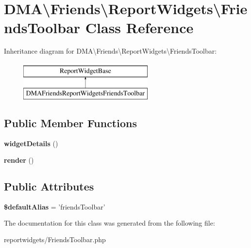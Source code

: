 \hypertarget{classDMA_1_1Friends_1_1ReportWidgets_1_1FriendsToolbar}{\section{D\-M\-A\textbackslash{}Friends\textbackslash{}Report\-Widgets\textbackslash{}Friends\-Toolbar Class Reference}
\label{classDMA_1_1Friends_1_1ReportWidgets_1_1FriendsToolbar}
}
Inheritance diagram for D\-M\-A\textbackslash{}Friends\textbackslash{}Report\-Widgets\textbackslash{}Friends\-Toolbar\-:\begin{figure}[H]
\begin{center}
\leavevmode
\includegraphics[height=2.000000cm]{d4/d8c/classDMA_1_1Friends_1_1ReportWidgets_1_1FriendsToolbar}
\end{center}
\end{figure}
\subsection*{Public Member Functions}
\begin{DoxyCompactItemize}
\item 
\hypertarget{classDMA_1_1Friends_1_1ReportWidgets_1_1FriendsToolbar_a56951946e166c46353910da4a5c399a1}{{\bfseries widget\-Details} ()}\label{classDMA_1_1Friends_1_1ReportWidgets_1_1FriendsToolbar_a56951946e166c46353910da4a5c399a1}

\item 
\hypertarget{classDMA_1_1Friends_1_1ReportWidgets_1_1FriendsToolbar_a5fb3de1ff5dd5186e068dcf8c5e8d154}{{\bfseries render} ()}\label{classDMA_1_1Friends_1_1ReportWidgets_1_1FriendsToolbar_a5fb3de1ff5dd5186e068dcf8c5e8d154}

\end{DoxyCompactItemize}
\subsection*{Public Attributes}
\begin{DoxyCompactItemize}
\item 
\hypertarget{classDMA_1_1Friends_1_1ReportWidgets_1_1FriendsToolbar_aabef17c5a99fc5f66554a91dd2cde59d}{{\bfseries \$default\-Alias} = 'friends\-Toolbar'}\label{classDMA_1_1Friends_1_1ReportWidgets_1_1FriendsToolbar_aabef17c5a99fc5f66554a91dd2cde59d}

\end{DoxyCompactItemize}


The documentation for this class was generated from the following file\-:\begin{DoxyCompactItemize}
\item 
reportwidgets/Friends\-Toolbar.\-php\end{DoxyCompactItemize}

